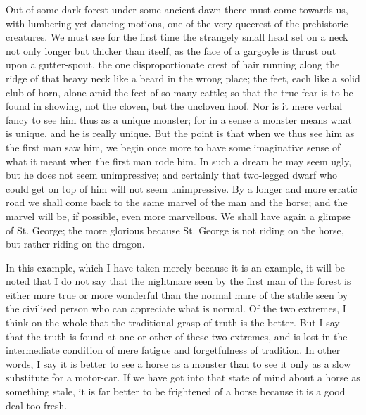Out of some dark forest under some ancient dawn there must come towards us, with lumbering yet dancing motions, one of the very queerest of the prehistoric creatures. We must see for the first time the strangely small head set on a neck not only longer but thicker than itself, as the face of a gargoyle is thrust out upon a gutter-spout, the one disproportionate crest of hair running along the ridge of that heavy neck like a beard in the wrong place; the feet, each like a solid club of horn, alone amid the feet of so many cattle; so that the true fear is to be found in showing, not the cloven, but the uncloven hoof. Nor is it mere verbal fancy to see him thus as a unique monster; for in a sense a monster means what is unique, and he is really unique. But the point is that when we thus see him as the first man saw him, we begin once more to have some imaginative sense of what it meant when the first man rode him. In such a dream he may seem ugly, but he does not seem unimpressive; and certainly that two-legged dwarf who could get on top of him will not seem unimpressive. By a longer and more erratic road we shall come back to the same marvel of the man and the horse; and the marvel will be, if possible, even more marvellous. We shall have again a glimpse of St. George; the more glorious because St. George is not riding on the horse, but rather riding on the dragon.

In this example, which I have taken merely because it is an example, it will be noted that I do not say that the nightmare seen by the first man of the forest is either more true or more wonderful than the normal mare of the stable seen by the civilised person who can appreciate what is normal. Of the two extremes, I think on the whole that the traditional grasp of truth is the better. But I say that the truth is found at one or other of these two extremes, and is lost in the intermediate condition of mere fatigue and forgetfulness of tradition. In other words, I say it is better to see a horse as a monster than to see it only as a slow substitute for a motor-car. If we have got into that state of mind about a horse as something stale, it is far better to be frightened of a horse because it is a good deal too fresh.

